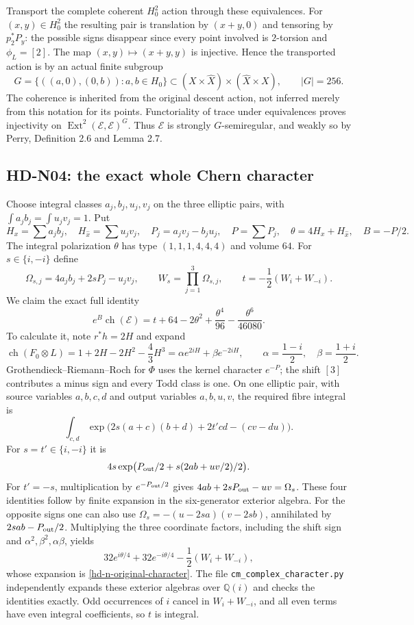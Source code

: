 Transport the complete coherent $H_0^2$ action through these equivalences.
For $(x,y)\in H_0^2$ the resulting pair is translation by $(x+y,0)$
and tensoring by $p_2^*P_y$: the possible signs disappear since every
point involved is $2$-torsion and $\phi_L=[2]$. The map
$(x,y)\mapsto(x+y,y)$ is injective. Hence the transported action is by
an actual finite subgroup
\begin{equation}\label{hd-n-G}
 G=\{((a,0),(0,b)):a,b\in H_0\}\subset
 (X\times\widehat X)\times(\widehat X\times X),\qquad |G|=256.
\end{equation}
The coherence is inherited from the original descent action, not
inferred merely from this notation for its points. Functoriality of
trace under equivalences proves injectivity on
$\operatorname{Ext}^2(\mathcal E,\mathcal E)^G$. Thus $\mathcal E$ is
strongly $G$-semiregular, and weakly so by Perry, Definition 2.6 and
Lemma 2.7.

\subsection{HD-N04: the exact whole Chern character}
\label{hd-n04}

Choose integral classes $a_j,b_j,u_j,v_j$ on the three elliptic pairs,
with $\int a_jb_j=\int u_jv_j=1$. Put
\[
 H_x=\sum a_jb_j,\quad H_{\widehat x}=\sum u_jv_j,\quad
 P_j=a_jv_j-b_ju_j,\quad P=\sum P_j,\quad
 \theta=4H_x+H_{\widehat x},\quad B=-P/2.
\]
The integral polarization $\theta$ has type $(1,1,1,4,4,4)$ and volume
$64$. For $s\in\{i,-i\}$ define
\[
 \Omega_{s,j}=4a_jb_j+2sP_j-u_jv_j,\qquad
 W_s=\prod_{j=1}^3\Omega_{s,j},\qquad
 t=-\frac12(W_i+W_{-i}).
\]
We claim the exact full identity
\begin{equation}\label{hd-n-original-character}
 e^B\operatorname{ch}(\mathcal E)
 =t+64-2\theta^2+\frac{\theta^4}{96}-\frac{\theta^6}{46080}.
\end{equation}
To calculate it, note $r^*h=2H$ and expand
\[
 \operatorname{ch}(F_0\otimes L)
 =1+2H-2H^2-\frac43H^3
 =\alpha e^{2iH}+\beta e^{-2iH},\qquad
 \alpha=\frac{1-i}{2},\quad\beta=\frac{1+i}{2}.
\]
Grothendieck--Riemann--Roch for $\Phi$ uses the kernel character
$e^{-P}$; the shift $[3]$ contributes a minus sign and every Todd
class is one. On one elliptic pair, with source variables $a,b,c,d$
and output variables $a,b,u,v$, the required fibre integral is
\[
 \int_{c,d}\exp\bigl(2s(a+c)(b+d)+2t'cd-(cv-du)\bigr).
\]
For $s=t'\in\{i,-i\}$ it is
\[
 4s\exp\bigl(P_{\rm out}/2+s(2ab+uv/2)/2\bigr).
\]
For $t'=-s$, multiplication by $e^{-P_{\rm out}/2}$ gives
$4ab+2sP_{\rm out}-uv=\Omega_s$.
These four identities follow by finite expansion in the six-generator
exterior algebra. For the opposite signs one can also use
$\Omega_s=-(u-2sa)(v-2sb)$, annihilated by $2sab-P_{\rm out}/2$.
Multiplying the three coordinate factors, including the shift sign and
$\alpha^2,\beta^2,\alpha\beta$, yields
\[
 32e^{i\theta/4}+32e^{-i\theta/4}-\frac12(W_i+W_{-i}),
\]
whose expansion is \eqref{hd-n-original-character}.
The file \texttt{cm\_complex\_character.py} independently expands
these exterior algebras over $\mathbb Q(i)$ and checks the identities
exactly. Odd occurrences of $i$ cancel in $W_i+W_{-i}$, and all even
terms have even integral coefficients, so $t$ is integral.

